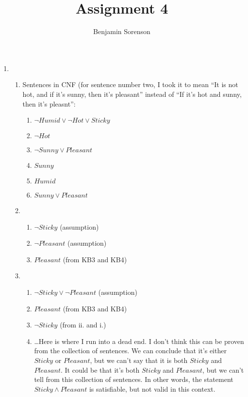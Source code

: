 \documentclass[11pt]{article}
\begin{document}
\author{Benjamin Sorenson} \title{Assignment 4}
\maketitle
\begin{enumerate}[label=\bfseries Question \arabic*:]
\item
  \begin{enumerate}
  \item Sentences in CNF (for sentence number two, I took it to mean
    ``It is not hot, and if it's sunny, then it's pleasant'' instead
    of ``If it's hot and sunny, then it's pleasnt'':
    \begin{enumerate}[label= KB\arabic*.]
    \item \(\lnot Humid \lor \lnot Hot \lor Sticky \)
    \item \(\lnot Hot\)
    \item \(\lnot Sunny \lor Pleasant\)
    \item \(Sunny\)
    \item \(Humid\)
    \item\(Sunny \lor Pleasant\)
    \end{enumerate}
  \item
    \begin{enumerate}
    \item \(\lnot Sticky\) (assumption)
    \item \(\lnot Pleasant\) (assumption)
    \item \(Pleasant \) (from KB3 and KB4)
    \end{enumerate}
  \item
    \begin{enumerate}
    \item \(\lnot Sticky \lor \lnot Pleasant\) (assumption)
    \item \(Pleasant \) (from KB3 and KB4)
    \item \(\lnot Sticky\) (from ii. and i.)
    \item \dots Here is where I run into a dead end. I don't think
      this can be proven from the collection of sentences. We can
      conclude that it's either \(Sticky\)
      or \(Pleasant\),
      but we can't say that it is both \(Sticky\)
      and \(Pleasant\).
      It could be that it's both \(Sticky\)
      and \(Pleasant\),
      but we can't tell from this collection of sentences.  In other
      words, the statement \(Sticky \land Pleasant\)
      is satisfiable, but not valid in this context.
    \end{enumerate}

\end{enumerate}
\end{enumerate}
\end{document}
